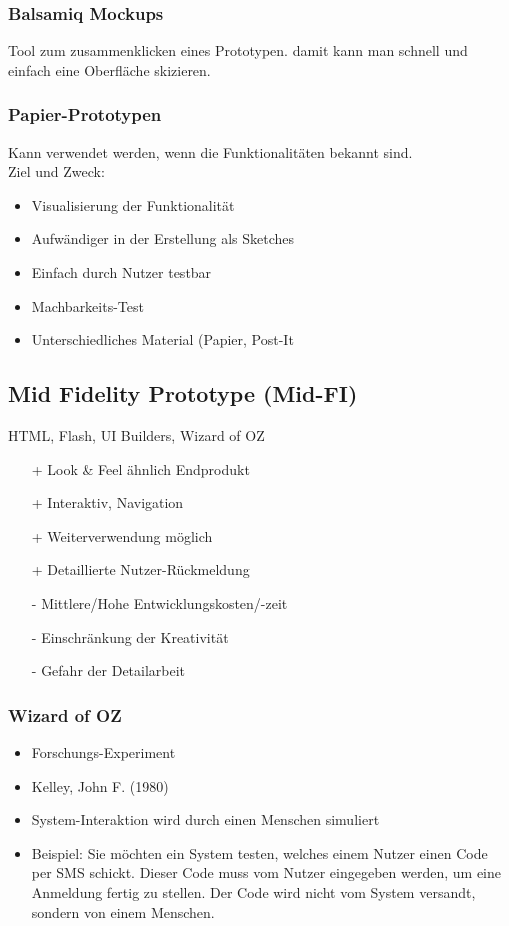 \documentclass[a4paper,10pt]{article}
\begin{document}
\subsubsection{Balsamiq Mockups}
Tool zum zusammenklicken eines Prototypen. damit kann man schnell und einfach eine Oberfläche skizieren.

\subsubsection{Papier-Prototypen}
Kann verwendet werden, wenn die Funktionalit\"aten bekannt sind. \\
Ziel und Zweck:
\begin{itemize}
	\item Visualisierung der Funktionalit\"at
	\item Aufw\"andiger in der Erstellung als Sketches
	\item Einfach durch Nutzer testbar
	\item Machbarkeits-Test
	\item Unterschiedliches Material (Papier, Post-It
\end{itemize}

\subsection{Mid Fidelity Prototype (Mid-FI)}
HTML, Flash, UI Builders, Wizard of OZ 
\begin{itemize}
	\item[+] Look \& Feel \"ahnlich Endprodukt
	\item[+]  Interaktiv, Navigation
	\item[+] Weiterverwendung m\"oglich
	\item[+] Detaillierte Nutzer-R\"uckmeldung
	\item[-] Mittlere/Hohe Entwicklungskosten/-zeit
	\item[-] Einschr\"ankung der Kreativit\"at
	\item[-] Gefahr der Detailarbeit
\end{itemize}

\subsubsection{Wizard of OZ}
\begin{itemize}
	\item Forschungs-Experiment
	\item Kelley, John F. (1980)
	\item System-Interaktion wird durch einen Menschen simuliert
	\item Beispiel: Sie m\"ochten ein System testen, welches einem Nutzer einen Code per SMS schickt. Dieser Code muss vom Nutzer eingegeben werden, um eine Anmeldung fertig zu stellen. Der Code wird nicht vom System versandt, sondern von einem Menschen.
\end{itemize}
\end{document}

